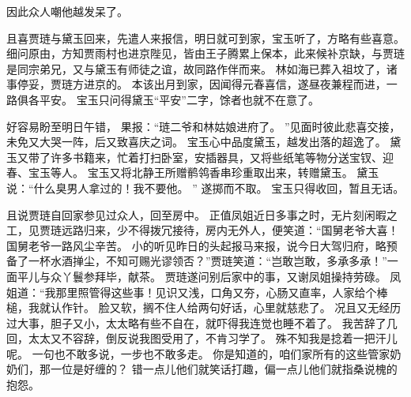 因此众人嘲他越发呆了。
\par
且喜贾琏与黛玉回来，先遣人来报信，明日就可到家，宝玉听了，方略有些喜意。
细问原由，方知贾雨村也进京陛见，皆由王子腾累上保本，此来候补京缺，与贾琏是同宗弟兄，又与黛玉有师徒之谊，故同路作伴而来。
林如海已葬入祖坟了，诸事停妥，贾琏方进京的。
本该出月到家，因闻得元春喜信，遂昼夜兼程而进，一路俱各平安。
宝玉只问得黛玉“平安”二字，馀者也就不在意了。
\par
好容易盼至明日午错，
果报：“琏二爷和林姑娘进府了。
”见面时彼此悲喜交接，未免又大哭一阵，后又致喜庆之词。
宝玉心中品度黛玉，越发出落的超逸了。
黛玉又带了许多书籍来，忙着打扫卧室，安插器具，又将些纸笔等物分送宝钗、迎春、宝玉等人。
宝玉又将北静王所赠鹡鸰香串珍重取出来，转赠黛玉。
黛玉说：“什么臭男人拿过的！我不要他。
”
遂掷而不取。
宝玉只得收回，暂且无话。
\par
且说贾琏自回家参见过众人，回至房中。
正值凤姐近日多事之时，无片刻闲暇之工，见贾琏远路归来，少不得拨冗接待，房内无外人，便笑道：“国舅老爷大喜！国舅老爷一路风尘辛苦。
小的听见昨日的头起报马来报，说今日大驾归府，略预备了一杯水酒掸尘，不知可赐光谬领否？”贾琏笑道：“岂敢岂敢，多承多承！”一面平儿与众丫鬟参拜毕，献茶。
贾琏遂问别后家中的事，又谢凤姐操持劳碌。
凤姐道：“我那里照管得这些事！见识又浅，口角又夯，心肠又直率，人家给个棒槌，我就认作针。
脸又软，搁不住人给两句好话，心里就慈悲了。
况且又无经历过大事，胆子又小，太太略有些不自在，就吓得我连觉也睡不着了。
我苦辞了几回，太太又不容辞，倒反说我图受用了，不肯习学了。
殊不知我是捻着一把汗儿呢。
一句也不敢多说，一步也不敢多走。
你是知道的，咱们家所有的这些管家奶奶们，那一位是好缠的？
错一点儿他们就笑话打趣，偏一点儿他们就指桑说槐的抱怨。
